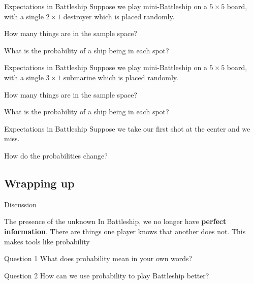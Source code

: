 \documentclass{beamer}
\begin{document}
\begin{frame}{Expectations in Battleship}
Suppose we play mini-Battleship on a $5\times 5$ board, with a single $2\times 1$ destroyer which is placed randomly.
\pause
\begin{block}[Question 1]
How many things are in the sample space?
\end{block}
\pause
\begin{block}[Question 2]
What is the probability of a ship being in each spot?
\end{block}
\end{frame}

\begin{frame}{Expectations in Battleship}
Suppose we play mini-Battleship on a $5\times 5$ board, with a single $3\times 1$ submarine which is placed randomly.
\pause
\begin{block}[Question 3]
How many things are in the sample space?
\end{block}
\pause
\begin{block}[Question 4]
What is the probability of a ship being in each spot?
\end{block}
\end{frame}

\begin{frame}{Expectations in Battleship}
Suppose we take our first shot at the center and we miss.
\pause
\begin{block}[Question 5]
How do the probabilities change?
\end{block}
\end{frame}

\subsection{Wrapping up}

\begin{frame}{Discussion}
\pause
  \begin{block}{The presence of the unknown}
	In Battleship, we no longer have \textbf{perfect information}.  There are
    things one player knows that another does not.  This makes tools like probability 
  \end{block}
\pause
  \begin{block}{Question 1}
    What does probability mean in your own words?
  \end{block}
\pause
  \begin{block}{Question 2}
    How can we use probability to play Battleship better?
  \end{block}
\end{frame}
\end{document}
